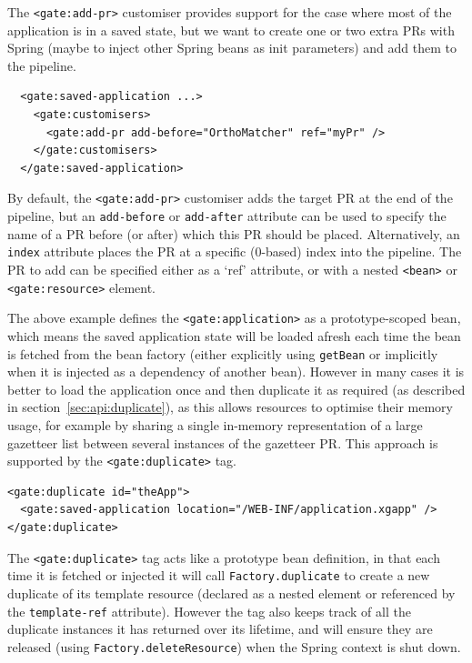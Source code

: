The \verb|<gate:add-pr>| customiser provides support for the case where most of
the application is in a saved state, but we want to create one or two extra PRs
with Spring (maybe to inject other Spring beans as init parameters) and add
them to the pipeline.
\begin{small}\begin{verbatim}
  <gate:saved-application ...>
    <gate:customisers>
      <gate:add-pr add-before="OrthoMatcher" ref="myPr" />
    </gate:customisers>
  </gate:saved-application>
\end{verbatim}\end{small}
%
By default, the \verb|<gate:add-pr>| customiser adds the target PR at the end
of the pipeline, but an \texttt{add-before} or \texttt{add-after} attribute can
be used to specify the name of a PR before (or after) which this PR should be
placed.  Alternatively, an \texttt{index} attribute places the PR at a specific
(0-based) index into the pipeline.  The PR to add can be specified either as a
`ref' attribute, or with a nested \verb|<bean>| or \verb|<gate:resource>|
element.


The above example defines the \verb|<gate:application>| as a prototype-scoped
bean, which means the saved application state will be loaded afresh each time
the bean is fetched from the bean factory (either explicitly using
\verb|getBean| or implicitly when it is injected as a dependency of another
bean).  However in many cases it is better to load the application once and
then duplicate it as required (as described in
section~\ref{sec:api:duplicate}), as this allows resources to optimise their
memory usage, for example by sharing a single in-memory representation of a
large gazetteer list between several instances of the gazetteer PR.  This
approach is supported by the \verb|<gate:duplicate>| tag.
\begin{small}\begin{verbatim}
<gate:duplicate id="theApp">
  <gate:saved-application location="/WEB-INF/application.xgapp" />
</gate:duplicate>
\end{verbatim}\end{small}
%
The \verb|<gate:duplicate>| tag acts like a prototype bean definition, in that
each time it is fetched or injected it will call \texttt{Factory.duplicate} to
create a new duplicate of its template resource (declared as a nested element
or referenced by the \verb|template-ref| attribute).  However the tag also
keeps track of all the duplicate instances it has returned over its lifetime,
and will ensure they are released (using \texttt{Factory.deleteResource}) when
the Spring context is shut down.

